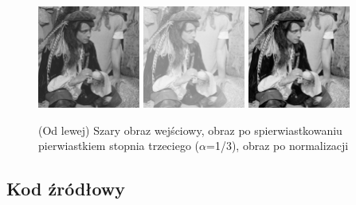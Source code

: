 \documentclass[final,a4paper,openany,12pt]{mwbk}
\begin{document}
\begin{figure}[H]
	\begin{center}
		\includegraphics[width=0.3\textwidth]{2/2Gray_Sqrt_Original}
		\includegraphics[width=0.3\textwidth]{2/2Gray_Sqrt_Result}
		\includegraphics[width=0.3\textwidth]{2/2Gray_Sqrt_Result_Norm}
	\end{center}
	\caption{(Od lewej) Szary obraz wejściowy, obraz po spierwiastkowaniu pierwiastkiem stopnia trzeciego ($\alpha$=1/3), obraz po normalizacji }
\end{figure}

\subsection*{Kod źródłowy}
\end{document}

